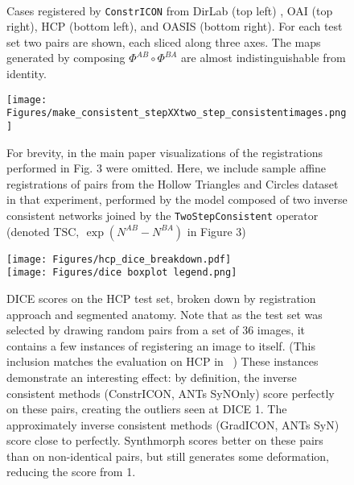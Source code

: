 \begin{figure}
{	 	
        \\
   }
	\caption{Cases registered by \texttt{ConstrICON} from DirLab (top left) , OAI (top right), HCP (bottom left), and OASIS (bottom right). For each test set two pairs are shown, each sliced along three axes. The maps generated by composing $\Phi^{AB} \circ \Phi^{BA}$ are almost indistinguishable from identity.}
	\label{fig:medical_sample}
	\vspace{-2em}
\end{figure}

\begin{figure}
    \centering
    \texttt{[image: Figures/make\_consistent\_stepXXtwo\_step\_consistentimages.png]}
    \caption{For brevity, in the main paper visualizations of the registrations performed in Fig. 3 were omitted. Here, we include sample affine registrations of pairs from the Hollow Triangles and Circles  dataset in that experiment, performed by the model composed of two inverse consistent networks joined by the \texttt{TwoStepConsistent} operator (denoted $\text{TSC},~\exp(N^{AB} - N^{BA})$ in Figure 3)}
    \label{fig:my_label}
\end{figure}

\begin{figure}
    \centering
    \texttt{[image: Figures/hcp\_dice\_breakdown.pdf]}\\
    \texttt{[image: Figures/dice boxplot legend.png]}\\

    \caption{DICE scores on the HCP test set, broken down by registration approach and segmented anatomy. Note that as the test set was selected by drawing random pairs from a set of 36 images, it contains a few instances of registering an image to itself. (This inclusion matches the evaluation on HCP in ~\cite{lin2022GradICON}) These instances demonstrate an interesting effect: by definition, the inverse consistent methods (ConstrICON, ANTs SyNOnly) score perfectly on these pairs, creating the outliers seen at DICE 1. The approximately inverse consistent methods (GradICON, ANTs SyN) score close to perfectly.  Synthmorph scores better on these pairs than on non-identical pairs, but still generates some deformation, reducing the score from 1.}
    \label{fig:brain_violin}
\end{figure}

